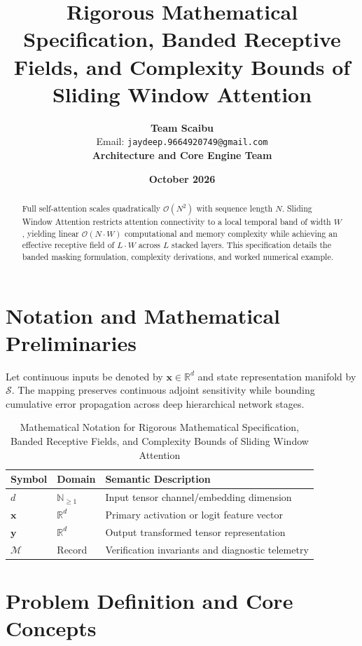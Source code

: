 \documentclass[11pt,a4paper]{article}
\title{\textbf{Rigorous Mathematical Specification, Banded Receptive Fields, and Complexity Bounds of Sliding Window Attention}}
\author{\textbf{Team Scaibu} \\ \small Email: \texttt{jaydeep.9664920749@gmail.com} \\ \small \textbf{Architecture and Core Engine Team}}
\date{\textbf{October 2026}}
\theoremstyle{definition}
\begin{document}
\maketitle

\begin{abstract}
Full self-attention scales quadratically $\mathcal{O}(N^2)$ with sequence length $N$. Sliding Window Attention restricts attention connectivity to a local temporal band of width $W$, yielding linear $\mathcal{O}(N \cdot W)$ computational and memory complexity while achieving an effective receptive field of $L \cdot W$ across $L$ stacked layers. This specification details the banded masking formulation, complexity derivations, and worked numerical example.
\end{abstract}

\section{Notation and Mathematical Preliminaries}

Let continuous inputs be denoted by $\mathbf{x} \in \mathbb{R}^d$ and state representation manifold by $\mathcal{S}$. The mapping preserves continuous adjoint sensitivity while bounding cumulative error propagation across deep hierarchical network stages.

\begin{table}[h]
\centering
\caption{Mathematical Notation for Rigorous Mathematical Specification, Banded Receptive Fields, and Complexity Bounds of Sliding Window Attention}
\begin{tabular}{lll}
\toprule
\textbf{Symbol} & \textbf{Domain} & \textbf{Semantic Description} \\
\midrule
$d$ & $\mathbb{N}_{\ge 1}$ & Input tensor channel/embedding dimension \\
$\mathbf{x}$ & $\mathbb{R}^d$ & Primary activation or logit feature vector \\
$\mathbf{y}$ & $\mathbb{R}^d$ & Output transformed tensor representation \\
$\mathcal{M}$ & Record & Verification invariants and diagnostic telemetry \\
\bottomrule
\end{tabular}
\end{table}

\section{Problem Definition and Core Concepts}
\end{document}
